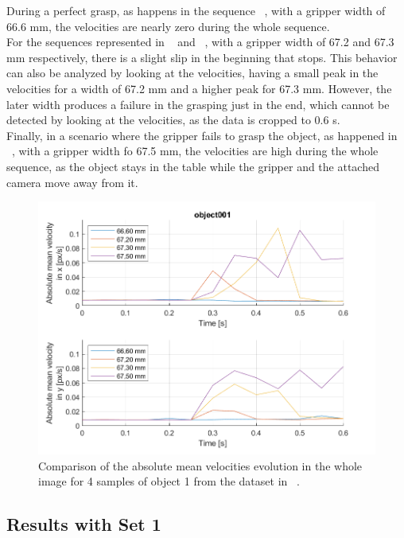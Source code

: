 During a perfect grasp, as happens in the sequence ~, with a gripper width of 66.6 mm, the velocities are nearly zero during the whole sequence.\\

For the sequences represented in ~ and ~, with a gripper width of 67.2 and 67.3 mm respectively, there is a slight slip in the beginning that stops. This behavior can also be analyzed by looking at the velocities, having a small peak in the velocities for a width of 67.2 mm and a higher peak for 67.3 mm. However, the later width produces a failure in the grasping just in the end, which cannot be detected by looking at the velocities, as the data is cropped to 0.6 s.\\

Finally, in a scenario where the gripper fails to grasp the object, as happened in ~, with a gripper width fo 67.5 mm, the velocities are high during the whole sequence, as the object stays in the table while the gripper and the attached camera move away from it.

\begin{figure}[h]
    \centering
    \includegraphics[width=\textwidth]{resources/images/gelsight_of}
    \caption{Comparison of the absolute mean velocities evolution in the whole image for 4 samples of object 1 from the dataset in ~\cite{gelsight2018}.}\label{fig:gelsight_of}
\end{figure}

\subsection{Results with Set 1}

